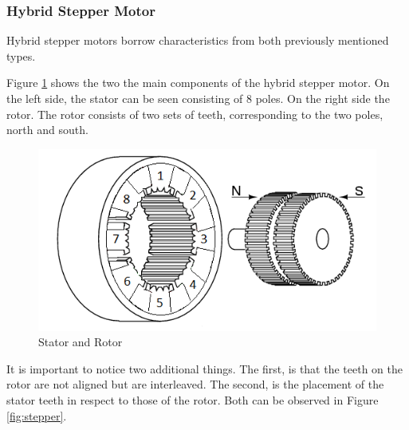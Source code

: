 \subsubsection{Hybrid Stepper Motor}
Hybrid stepper motors borrow characteristics from both previously mentioned types.

Figure \ref{fig:hybrid_components} shows the two the main components of the hybrid stepper motor. 
On the left side, the stator can be seen consisting of 8 poles. On the right side the rotor. The 
rotor consists of two sets of teeth, corresponding to the two poles, north and south.
\begin{figure}[h]
	\centering
	\includegraphics[width=\textwidth]{figures/move/motor27.png}
	\caption{Stator and Rotor}
	\label{fig:hybrid_components}
\end{figure}

It is important to notice two additional things. The first, is that the teeth on the rotor are not 
aligned but are interleaved. The second, is the placement of the stator teeth in respect to those 
of the rotor. Both can be observed in Figure \ref{fig:stepper}.

